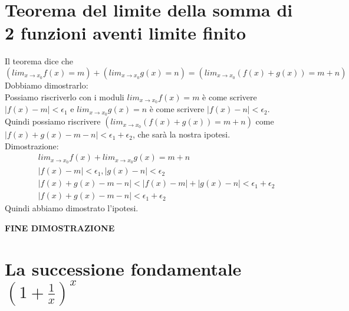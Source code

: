 \documentclass[11pt]{article}
\begin{document}
\section{Teorema del limite della somma di 2 funzioni aventi limite finito}
Il teorema dice che $$(lim_{x \rightarrow x_{0}}f(x) = m) + (lim_{x \rightarrow x_{0}}g(x) = n) = (lim_{x \rightarrow x_{0}}(f(x)+g(x)) = m+n)$$
Dobbiamo dimostrarlo:\\
Possiamo riscriverlo con i moduli $lim_{x \rightarrow x_{0}}f(x) = m$ è come scrivere $|f(x)-m| < \epsilon_{1}$ e $lim_{x \rightarrow x_{0}}g(x) = n$ è come scrivere $|f(x)-n| < \epsilon_{2}$.\\
Quindi possiamo riscrivere $(lim_{x \rightarrow x_{0}}(f(x)+g(x)) = m+n)$ come $|f(x)+g(x)-m-n| < \epsilon_{1} + \epsilon_{2}$, che sarà la nostra ipotesi.\\
Dimostrazione:\\
\begin{align*}
    &lim_{x \rightarrow x_{0}}f(x) + lim_{x \rightarrow x_{0}}g(x) = m + n\\
    &|f(x)-m|<\epsilon_{1} , |g(x)-n|<\epsilon_{2}\\
    &|f(x)+g(x)-m-n| < |f(x)-m| + |g(x)-n| < \epsilon_{1} + \epsilon_{2}\\
    &|f(x)+g(x)-m-n| < \epsilon_{1} + \epsilon_{2}
\end{align*}
Quindi abbiamo dimostrato l'ipotesi.
\begin{center}
    \textbf{FINE DIMOSTRAZIONE}
\end{center}
\section{La successione fondamentale $(1+\frac{1}{x})^{x}$}
\end{document}
